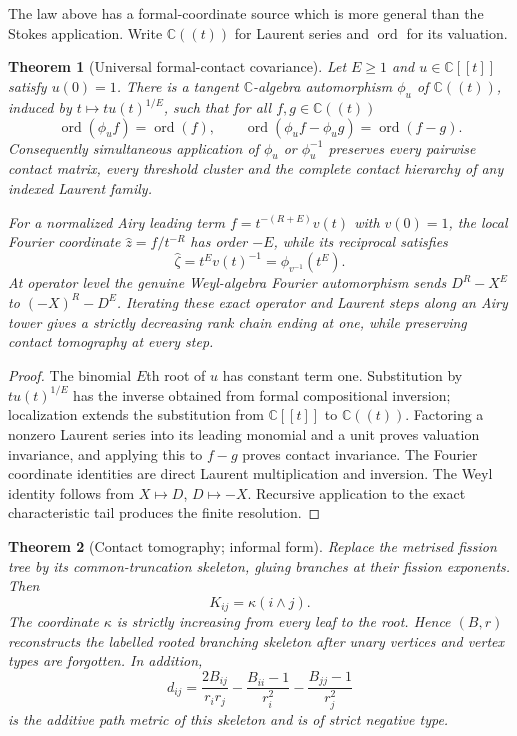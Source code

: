 \documentclass[11pt,a4paper]{amsart}
\theoremstyle{plain}
\newtheorem{theorem}{Theorem}[section]
\theoremstyle{definition}
\newcommand{\CC}{\mathbb C}
\newcommand{\ord}{\operatorname{ord}}
\begin{document}
The law above has a formal-coordinate source which is more general than the Stokes application.
Write $\CC((t))$ for Laurent series and $\ord$ for its valuation.

\begin{theorem}[Universal formal-contact covariance]\label{thm:intro-covariance}
Let $E\ge1$ and $u\in\CC[[t]]$ satisfy $u(0)=1$.  There is a tangent
$\CC$-algebra automorphism $\phi_u$ of $\CC((t))$, induced by
$t\mapsto t u(t)^{1/E}$, such that for all $f,g\in\CC((t))$
\[
 \ord(\phi_u f)=\ord(f),\qquad
 \ord(\phi_u f-\phi_u g)=\ord(f-g).
\]
Consequently simultaneous application of $\phi_u$ or $\phi_u^{-1}$ preserves every pairwise
contact matrix, every threshold cluster and the complete contact hierarchy of any indexed Laurent
family.

For a normalized Airy leading term $f=t^{-(R+E)}v(t)$ with $v(0)=1$, the local Fourier coordinate
$\widehat z=f/t^{-R}$ has order $-E$, while its reciprocal satisfies
\[
 \widehat\zeta=t^E v(t)^{-1}=\phi_{v^{-1}}(t^E).
\]
At operator level the genuine Weyl-algebra Fourier automorphism sends
$D^R-X^E$ to $(-X)^R-D^E$.  Iterating these exact operator and Laurent steps along an Airy tower
gives a strictly decreasing rank chain ending at one, while preserving contact tomography at every
step.
\end{theorem}

\begin{proof}
The binomial $E$th root of $u$ has constant term one.  Substitution by
$t u(t)^{1/E}$ has the inverse obtained from formal compositional inversion; localization extends
the substitution from $\CC[[t]]$ to $\CC((t))$.  Factoring a nonzero Laurent series into its leading
monomial and a unit proves valuation invariance, and applying this to $f-g$ proves contact
invariance.  The Fourier coordinate identities are direct Laurent multiplication and inversion.
The Weyl identity follows from $X\mapsto D$, $D\mapsto-X$.  Recursive application to the exact
characteristic tail produces the finite resolution.
\end{proof}

\begin{theorem}[Contact tomography; informal form]\label{thm:intro-tomography}
Replace the metrised fission tree by its common-truncation skeleton, gluing branches at their
fission exponents.  Then
\[
                         K_{ij}=\kappa(i\wedge j).
\]
The coordinate $\kappa$ is strictly increasing from every leaf to the root.  Hence $(B,r)$
reconstructs the labelled rooted branching skeleton after unary vertices and vertex types are
forgotten.  In addition,
\begin{equation}\label{eq:intro-energy}
 d_{ij}=\frac{2B_{ij}}{r_ir_j}-\frac{B_{ii}-1}{r_i^2}
        -\frac{B_{jj}-1}{r_j^2}
\end{equation}
is the additive path metric of this skeleton and is of strict negative type.
\end{theorem}
\end{document}

